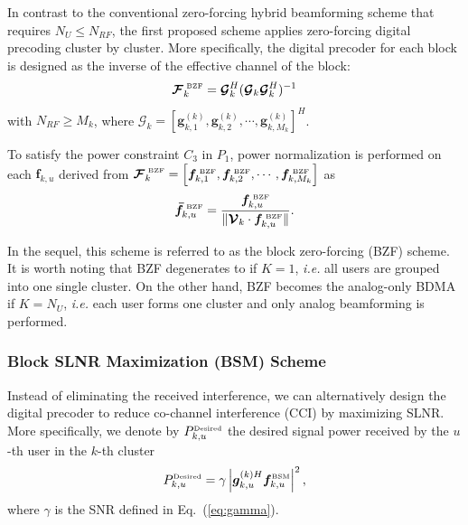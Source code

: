 \documentclass[conference]{IEEEtran}
\begin{document}
{In contrast to the conventional zero-forcing hybrid beamforming scheme \cite{el2014spatially} that requires $N_U\leq N_{RF}$, the first proposed scheme applies zero-forcing digital precoding cluster by cluster. More specifically, the digital precoder for each block is designed as the inverse of the effective channel of the block:
\begin{equation}
\bm{\mathcal{F}}^{\tiny\mbox{ BZF}}_{k} = \bm{\mathcal{G}}_k^H (\bm{\mathcal{G}}_k \bm{\mathcal{G}}_k^H)^{-1}
\label{eq:Fbzf}
\end{equation}
with $N_{RF}\geq M_k$, where $\bm{\mathcal{G}}_k = [\bm{g}^{(k)}_{k,1}, \bm{g}^{(k)}_{k,2},\cdots,\bm{g}^{(k)}_{k,M_k}]^H$.

To satisfy the power constraint $C_3$ in $P_1$, power normalization is performed on each ${\bm f}_{k,u}$ derived from $\bm{\mathcal{F}}^{\tiny\mbox{ BZF}}_{k}=\left[\bm{f}^{\tiny\mbox{ BZF}}_{k,1},\bm{f}^{\tiny\mbox{ BZF}}_{k,2},\cdots,\bm{f}^{\tiny\mbox{ BZF}}_{k,M_k}\right]$ as
\begin{equation}\label{eq:ZFU-HBF2}
\bm{\bar{f}}^{\tiny\mbox{ BZF}}_{k,u} = \frac{\bm{f}^{\tiny\mbox{ BZF}}_{k,u}}{\|\bm{\mathcal{V}}_k\cdot\bm{f}^{\tiny\mbox{ BZF}}_{k,u}\|}.
\end{equation}

In the sequel, this scheme is referred to as the block zero-forcing (BZF) scheme. It is worth noting that BZF degenerates to \cite{el2014spatially} if $K=1$, {\em i.e.} all users are grouped into one single cluster. On the other hand, BZF becomes the analog-only BDMA if $K=N_U$, {\em i.e.} each user forms one cluster and only analog beamforming is performed.


\subsubsection{Block SLNR Maximization (BSM) Scheme}
Instead of eliminating the received interference, we can alternatively design the digital precoder to reduce co-channel interference (CCI) by maximizing SLNR. More specifically, we denote by $P^{\tiny\mbox{Desired}}_{k,u}$ the desired signal power received by the $u$-th user in the $k$-th cluster
\begin{equation}
P^{\tiny\mbox{Desired}}_{k,u} = \gamma\left|\bm{g}_{k,u}^{(k)H}  \bm{f}^{\tiny\mbox{BSM}}_{k,u}\right|^2,
\end{equation}
where $\gamma$ is the SNR defined in Eq.~(\ref{eq:gamma}).

}
\end{document}
